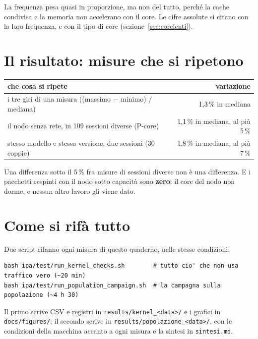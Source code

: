 \documentclass[11pt,a4paper,oneside]{report}
\begin{document}
\begin{lezione}
La frequenza pesa quasi in proporzione, ma non del tutto, perché la cache
condivisa e la memoria non accelerano con il core. Le cifre assolute si citano
con la loro frequenza, e con il tipo di core (sezione~\ref{sec:corelenti}).
\end{lezione}

\section{Il risultato: misure che si ripetono}

\begin{center}
\small
\begin{tabular}{@{}lr@{}}
\toprule
\textbf{che cosa si ripete} & \textbf{variazione} \\
\midrule
i tre giri di una misura ((massimo $-$ minimo) / mediana) & 1,3\,\% in mediana \\
il nodo senza rete, in 109 sessioni diverse (P-core) & 1,1\,\% in mediana, al più 5\,\% \\
stesso modello e stessa versione, due sessioni (30 coppie) & 1,8\,\% in mediana, al più 7\,\% \\
\bottomrule
\end{tabular}
\end{center}

Una differenza sotto il 5\,\% fra misure di sessioni diverse non è una
differenza. E i pacchetti respinti con il nodo sotto capacità sono
\textbf{zero}: il core del nodo non dorme, e nessun altro lavoro gli viene dato.

\section{Come si rifà tutto}

Due script rifanno ogni misura di questo quaderno, nelle stesse condizioni:

\begin{lstlisting}
bash ipa/test/run_kernel_checks.sh        # tutto cio' che non usa traffico vero (~20 min)
bash ipa/test/run_population_campaign.sh  # la campagna sulla popolazione (~4 h 30)
\end{lstlisting}

Il primo scrive CSV e registri in \texttt{results/kernel\_<data>/} e i grafici in
\texttt{docs/figures/}; il secondo scrive in \texttt{results/popolazione\_<data>/},
con le condizioni della macchina accanto a ogni misura e la sintesi in
\texttt{sintesi.md}.
\end{document}

